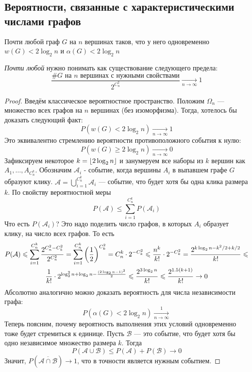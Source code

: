 \subsection{Вероятности, связанные с характеристическими числами графов}

\begin{theorem}
	Почти любой граф $G$ на $n$ вершинах таков, что у него одновременно $w(G) < 2\log_2 n$ и $\alpha(G) < 2\log_2 n$
\end{theorem}

\begin{note}
	\textit{Почти любой} нужно понимать как существование следующего предела:
	\[
		\frac{\text{\#$G$ на $n$ вершинах с нужными свойствами}}{2^{C_n^2}} \xrightarrow[n \to \infty]{} 1
	\]
\end{note}

\begin{proof}
	Введём классическое вероятностное пространство. Положим $\Omega_n$ --- множество всех графов на $n$ вершинах (без изоморфизма). Тогда, хотелось бы доказать следующий факт:
	\[
		P(w(G) < 2\log_2 n) \xrightarrow[n \to \infty]{} 1
	\]
	Это эквивалентно стремлению вероятности противоположного события к нулю:
	\[
		P(w(G) \ge 2\log_2 n) \xrightarrow[n \to \infty]{} 0
	\]
	Зафиксируем некоторое $k = \left\lfloor 2\log_2 n \right\rfloor$ и занумеруем все наборы из $k$ вершин как $A_1, \ldots, A_{C_n^k}$. Обозначим $\mathcal{A}_i$ - событие, когда вершины $A_i$ в выпавшем графе $G$ образуют клику. $\mathcal{A} = \bigcup_{i = 1}^{C_n^k} \mathcal{A}_i$  --- событие, что будет хотя бы одна клика размера $k$. По свойству вероятностной меры
	\[
		P(\mathcal{A}) \le \sum_{i = 1}^{C_n^k} P(\mathcal{A}_i)
	\]
	Что есть $P(\mathcal{A}_i)$? Это надо поделить число графов, в которых $A_i$ образует клику, на число всех графов. То есть
	\begin{multline*}
		P(\mathcal{A}) \leqslant \sum_{i = 1}^{C_n^k} \frac{2^{C_n^2 - C_k^2}}{2^{C_n^2}} = \sum_{i = 1}^{C_n^k} \left(\frac{1}{2}\right)^{C_k^2} = C_n^k \cdot 2^{-C_k^2} \leqslant \frac{n^k}{k!} \cdot 2^{-C_k^2} = \frac{2^{k \log_2 n - k^2 / 2 + k / 2}}{k!} \leqslant
		\\
		\frac{1}{k!} \cdot 2^{\log^2_2 n + \log_2 n - \frac{(2\log_2 n - 1)^2}{2}} \leqslant \frac{2^{3\log_2 n}}{k!} \leqslant \frac{2^{1.5(k + 1)}}{k!} \to 0
	\end{multline*}
	Абсолютно аналогично можно доказать вероятность для числа независимости графа:
	\[
		P(\alpha(G) < 2\log_2 n) \xrightarrow[n \to \infty] 1
	\]
	Теперь поясним, почему вероятность выполнения этих условий одновременно тоже будет стремиться к единице. Пусть $\mathcal{B}$ --- это событие, что будет хотя бы одно независимое множество размера $k$. Тогда
	\[
		P(\mathcal{A} \cup \mathcal{B}) \le P(\mathcal{A}) + P(\mathcal{B}) \to 0
	\]
	Значит, $P(\overline{\mathcal{A} \cap \mathcal{B}}) \to 1$, что в точности является нужным событием.
\end{proof}

